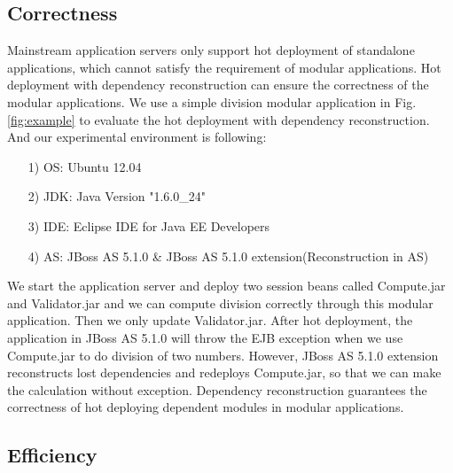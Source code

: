 \documentclass[conference]{IEEEtran}
\begin{document}
\subsection{Correctness}
Mainstream application servers only support hot deployment of standalone applications, which cannot satisfy the requirement of modular applications.
Hot deployment with dependency reconstruction can ensure the correctness of the modular applications.
We use a simple division modular application in Fig.\ref{fig:example} to evaluate the hot deployment with dependency reconstruction.
And our experimental environment is following:
\begin{itemize}[]
\item[1)] OS: Ubuntu 12.04
\item[2)] JDK: Java Version "1.6.0\_24"
\item[3)] IDE: Eclipse IDE for Java EE Developers
\item[4)] AS: JBoss AS 5.1.0 \& JBoss AS 5.1.0 extension(Reconstruction in AS)
\end{itemize}

We start the application server and deploy two session beans called Compute.jar and Validator.jar and we can compute division correctly through this modular application.
Then we only update Validator.jar.
After hot deployment, the application in JBoss AS 5.1.0 will throw the EJB exception when we use Compute.jar to do division of two numbers.
However, JBoss AS 5.1.0 extension reconstructs lost dependencies and redeploys Compute.jar, so that we can make the calculation without exception.
Dependency reconstruction guarantees the correctness of hot deploying dependent modules in modular applications.

\subsection{Efficiency}
\end{document}
